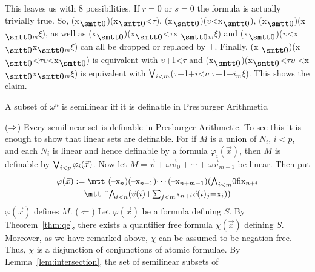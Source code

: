 This leaves us with 8 possibilities. If $r = 0$ or $s = 0$ the 
formula is actually trivially true. So, 
{\mtt (x$_{\snull}$)(x$_{\snull}$<$\tau$)}, 
{\mtt (x$_{\snull}$)($\upsilon$<x$_{\snull}$)}, 
{\mtt (x$_{\snull}$)(x$_{\snull}$$_m\xi$)}, 
as well as
{\mtt (x$_{\snull}$)(x$_{\snull}$<$\tau$x%
$_{\snull}$$_m\xi$)} 
and {\mtt (x$_{\snull}$)($\upsilon$<x$_{\snull}%
$x$_{\snull}$$_m \xi$)}  can all be dropped 
or replaced by $\boldsymbol{\top}$. Finally, {\mtt (x%
$_{\snull}$)(x$_{\snull}$<$\tau$$\upsilon$<x$_{\snull}$)} 
is equivalent with  {\mtt $\upsilon$+1<$\tau$} and 
{\mtt (x$_{\snull}$)(x$_{\snull}$<$\tau$$\upsilon$%
<x$_{\snull}$x$_{\snull}$$_m \xi$)} is equivalent with
{\mtt $\bigvee_{i < m}$($\tau$+1+$i$<$\upsilon$%
$\tau$+1+$i$$_m \xi$)}.
This shows the claim.
\proofend
\nocite{ginsburgspanier:presburger}
\nocite{ginsburgspanier:semilinear}
\begin{thm}
\label{thm:semabschluss}
A subset of $\omega^n$ is se\-mi\-li\-ne\-ar iff it is definable 
in Presburger Arithmetic. 
\end{thm}
\proofbeg
($\Rightarrow$) Every semilinear set is definable in Presburger Arithmetic.
To see this it is enough to show that linear sets are definable. For 
if $M$ is a union of $N_i$, $i < p$, and each $N_i$ is linear and 
hence definable by a formula $\varphi_i(\vec{x})$, then $M$ is 
definable by $\bigvee_{i < p} \varphi_i(\vec{x})$. Now let 
$M = \vec{v} + \omega \vec{v}_0 + \dotsb + \omega \vec{v}_{m-1}$ be 
linear. Then put 
\begin{multline}
\varphi(\vec{x}) := \mbox{\mtt (\symbol{21}x$_n$)(\symbol{21}%
x$_{n+1}$)$\dotsb$(\symbol{21}x$_{n+m-1}$)($\gund_{i < m}$0\symbol{28}%
x$_{n+i}$} \\
 	\mbox{\mtt \symbol{4}$\gund_{i < n}$($\vec{v}(i)$%
+$\sum_{j < m}$x$_{n+i}\vec{v}(i)_j$=x$_{i}$))}
\end{multline}
$\varphi(\vec{x})$ defines $M$. ($\Leftarrow$) Let $\varphi(\vec{x})$ be a 
formula defining $S$. By Theorem~\ref{thm:qe}, there exists a 
quantifier free formula $\chi(\vec{x})$ defining $S$. Moreover, 
as we have remarked above, $\chi$ can be assumed to be negation free. 
Thus, $\chi$ is a disjunction of conjunctions of atomic formulae. 
By Lemma~\ref{lem:intersection}, the set of semilinear subsets of 
